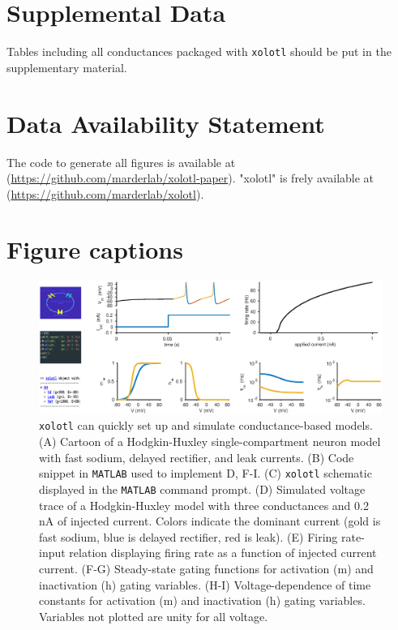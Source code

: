 \documentclass{frontiersSCNS} %
\begin{document}
\section*{Supplemental Data}
Tables including all conductances packaged with \texttt{xolotl} should be put in the supplementary material.

\section*{Data Availability Statement}

The code to generate all figures is available at (\url{https://github.com/marderlab/xolotl-paper}). "xolotl" is frely available at (\url{https://github.com/marderlab/xolotl}).

%
%
%
%
%
%

\printbibliography

%
%
%
%
%
%


\section*{Figure captions}

\FloatBarrier

\begin{figure}
	\centering
	\includegraphics[width=1.0\linewidth]{gfx/figure_HH}
	\caption{\texttt{xolotl} can quickly set up and simulate conductance-based models. (A) Cartoon of a Hodgkin-Huxley single-compartment neuron model with fast sodium, delayed rectifier, and leak currents. (B) Code snippet in \texttt{MATLAB} used to implement D, F-I. (C) \texttt{xolotl} schematic displayed in the \texttt{MATLAB} command prompt. (D) Simulated voltage trace of a Hodgkin-Huxley model with three conductances and 0.2 nA of injected current. Colors indicate the dominant current (gold is fast sodium, blue is delayed rectifier, red is leak). (E) Firing rate-input relation displaying firing rate as a function of injected current current. (F-G) Steady-state gating functions for activation (m) and inactivation (h) gating variables. (H-I) Voltage-dependence of time constants for activation (m) and inactivation (h) gating variables. Variables not plotted are unity for all voltage.}
	\label{fig:figurehh}
\end{figure}
\end{document}
